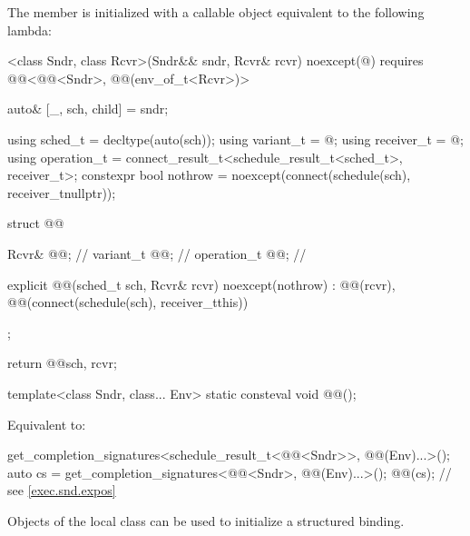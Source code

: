 \pnum
The member 
is initialized with a callable object equivalent to the following lambda:
\begin{codeblock}
[]<class Sndr, class Rcvr>(Sndr&& sndr, Rcvr& rcvr) noexcept(@\seebelow@)
    requires @@<@@<Sndr>, @@(env_of_t<Rcvr>)> {

  auto& [_, sch, child] = sndr;

  using sched_t = decltype(auto(sch));
  using variant_t = @\seebelow@;
  using receiver_t = @\seebelow@;
  using operation_t = connect_result_t<schedule_result_t<sched_t>, receiver_t>;
  constexpr bool nothrow = noexcept(connect(schedule(sch), receiver_t{nullptr}));

  struct @@ {
    Rcvr& @@;                 // \expos
    variant_t @@;     // \expos
    operation_t @@;       // \expos

    explicit @@(sched_t sch, Rcvr& rcvr) noexcept(nothrow)
      : @@(rcvr), @@(connect(schedule(sch), receiver_t{this})) {}
  };

  return @@{sch, rcvr};
}
\end{codeblock}

\begin{itemdecl}
template<class Sndr, class... Env>
  static consteval void @@();
\end{itemdecl}

\begin{itemdescr}
\pnum
\effects
Equivalent to:
\begin{codeblock}
get_completion_signatures<schedule_result_t<@@<Sndr>>, @@(Env)...>();
auto cs = get_completion_signatures<@@<Sndr>, @@(Env)...>();
@@(cs);   // see \ref{exec.snd.expos}
\end{codeblock}
\end{itemdescr}

\pnum
Objects of the local class  can be used
to initialize a structured binding.


